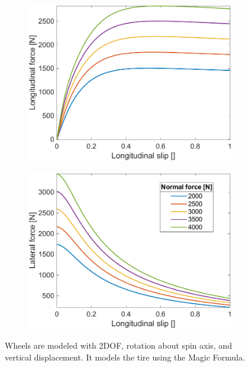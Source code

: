 \documentclass[a4paper, fleqn]{cas-dc}
\begin{document}
	\begin{figure}[htbp]
		\centering
		\begin{subfigure}[b]{0.48\columnwidth}
			\centering
			\includegraphics[width=\linewidth]{figures/LongitudinalForce_slip.pdf}
		\end{subfigure}
		\begin{subfigure}[b]{0.48\columnwidth}
			\centering
			\includegraphics[width=\linewidth]{figures/LateralForce_slip.pdf}
		\end{subfigure}
		\caption{Wheels are modeled with 2DOF, rotation about spin axis, and vertical displacement. It models the tire using the Magic Formula.\cite{pacejka2005tire}}
		\label{FIG:WheelSlips}
	\end{figure}
		
\end{document}

